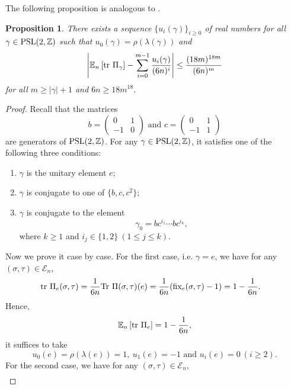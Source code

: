 \documentclass{amsart}
\theoremstyle{plain}
\newtheorem{proposition}[theorem]{Proposition}
\theoremstyle{definition}
\theoremstyle{remark}
\begin{document}
    

    The following proposition is analogous to \cite[Assumption 1.3]{MPvH25}.
    
    \begin{proposition}\label{p-count}
    There exists a sequence $\{u_i(\gamma)\}_{i\geq 0}$ of real numbers for all $\gamma\in\textnormal{PSL}(2,\mathbb{Z})$ such that $u_0(\gamma)=\rho(\lambda(\gamma))$ and
    $$\left|\mathbb{E}_n\left[\textnormal{tr }\Pi_\gamma\right]-\sum\limits_{i=0}^{m-1}\frac{u_i(\gamma)}{(6n)^i}\right|\leq\frac{(18m)^{18m}}{(6n)^m}$$
    for all $m\geq |\gamma|+1$ and $6n\geq 18m^{18}$.
    \end{proposition}
    \begin{proof}
     Recall that the matrices 
     $$b=\begin{pmatrix}
         0 & 1 \\ -1 & 0
     \end{pmatrix} \text{ and }c=\begin{pmatrix}
         0 & 1 \\ -1 & 1
     \end{pmatrix}$$
     are generators of $\textnormal{PSL}(2,\mathbb{Z})$.
        For any $\gamma\in\textnormal{PSL}(2,\mathbb{Z})$, it satisfies one of the following three conditions:
        \begin{enumerate}
            \item $\gamma$ is the unitary element $e$;
            \item $\gamma$ is conjugate to one of $\{b,c,c^2\}$;
            \item $\gamma$ is conjugate to the element
        $$\gamma_0=bc^{i_1}\cdots bc^{i_k},$$
        where $k\geq 1$ and $i_j\in\{1,2\}\ (1\leq j\leq k)$.
        \end{enumerate}
         Now we prove it case by case.
        For the first case, i.e. $\gamma=e$, we have for any $(\sigma,\tau)\in\mathcal{E}_n$,
        \begin{align*}
        \textnormal{tr }\Pi_e(\sigma,\tau)&=\frac{1}{6n}\textnormal{Tr }\Pi(\sigma,\tau)(e)=\frac{1}{6n}(\textnormal{fix}_e(\sigma,\tau)-1)=1-\frac{1}{6n}.
        \end{align*}
        Hence,
        $$\mathbb{E}_n\left[\textnormal{tr }\Pi_e\right]=1-\frac{1}{6n},$$ it suffices to take $$u_0(e)=\rho(\lambda(e))=1,\ u_1(e)=-1\text{ and }u_i(e)=0\ (i\geq 2).$$
         For the second case, we have for any $(\sigma,\tau)\in\mathcal{E}_n$,
        \begin{align*}

\end{align*}
\end{proof}
\end{document}
